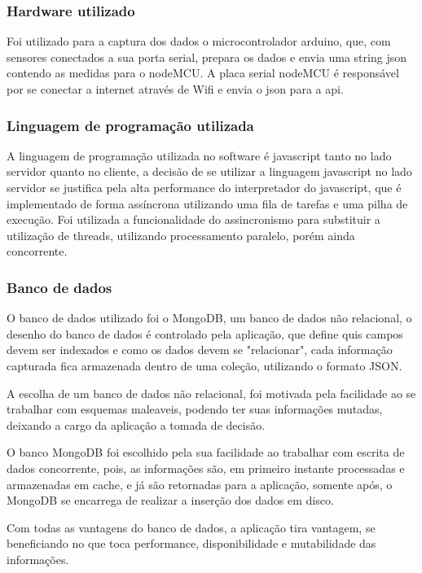 \subsubsection{Hardware utilizado}

Foi utilizado para a captura dos dados o microcontrolador arduino, que, com sensores conectados a sua porta serial, prepara os dados e envia uma string json contendo as medidas para o nodeMCU.
A placa serial nodeMCU é responsável por se conectar a internet através de Wifi e envia o json para a api.

\subsubsection{Linguagem de programação utilizada}

A linguagem de programação utilizada no software é javascript tanto no lado servidor quanto no cliente, a decisão de se utilizar a linguagem javascript no lado servidor se justifica pela alta performance do interpretador do javascript, que é implementado de forma assíncrona utilizando uma fila de tarefas e uma pilha de execução. Foi utilizada a funcionalidade do assincronismo para substituir a utilização de threads, utilizando processamento paralelo, porém ainda concorrente.

\subsubsection{Banco de dados}

O banco de dados utilizado foi o MongoDB, um banco de dados não relacional, o desenho do banco de dados é controlado pela aplicação, que define quis campos devem ser indexados e como os dados devem se "relacionar", cada informação capturada fica armazenada dentro de uma coleção, utilizando o formato JSON.

A escolha de um banco de dados não relacional, foi motivada pela facilidade ao se trabalhar com esquemas maleaveis, podendo ter suas informações mutadas, deixando a cargo da aplicação a tomada de decisão.

O banco MongoDB foi escolhido pela sua facilidade ao trabalhar com escrita de dados concorrente, pois, as informações são, em primeiro instante processadas e armazenadas em cache, e já são retornadas para a aplicação, somente após, o MongoDB se encarrega de realizar a inserção dos dados em disco.

Com todas as vantagens do banco de dados, a aplicação tira vantagem, se beneficiando no que toca performance, disponibilidade e mutabilidade das informações.

